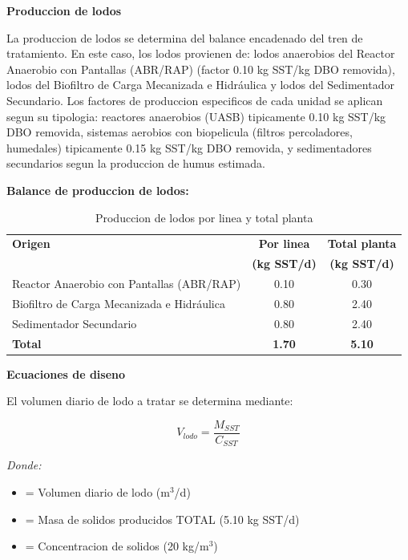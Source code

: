 \documentclass[12pt,a4paper]{article}
\begin{document}
\textbf{Produccion de lodos}

La produccion de lodos se determina del balance encadenado del tren de tratamiento. En este caso, los lodos provienen de: lodos anaerobios del Reactor Anaerobio con Pantallas (ABR/RAP) (factor 0.10 kg SST/kg DBO removida), lodos del Biofiltro de Carga Mecanizada e Hidráulica y lodos del Sedimentador Secundario. Los factores de produccion especificos de cada unidad se aplican segun su tipologia: reactores anaerobios (UASB) tipicamente 0.10 kg SST/kg DBO removida, sistemas aerobios con biopelicula (filtros percoladores, humedales) tipicamente 0.15 kg SST/kg DBO removida, y sedimentadores secundarios segun la produccion de humus estimada.

\textbf{Balance de produccion de lodos:}

\begin{table}[H]
\centering
\small
\caption{Produccion de lodos por linea y total planta}
\begin{tabular}{p{6cm}cc}
\toprule
\textbf{Origen} & \textbf{Por linea} & \textbf{Total planta} \\
 & \textbf{(kg SST/d)} & \textbf{(kg SST/d)} \\
\midrule
Reactor Anaerobio con Pantallas (ABR/RAP) & 0.10 & 0.30 \\
Biofiltro de Carga Mecanizada e Hidráulica & 0.80 & 2.40 \\
Sedimentador Secundario & 0.80 & 2.40 \\
\midrule
\textbf{Total} & \textbf{1.70} & \textbf{5.10} \\
\bottomrule
\end{tabular}
\end{table}

\textbf{Ecuaciones de diseno}

El volumen diario de lodo a tratar se determina mediante:

\begin{equation}
V_{lodo} = \frac{M_{SST}}{C_{SST}}
\end{equation}

\textit{Donde:}
\begin{itemize}[noitemsep,leftmargin=2em]
    \item[$V_{lodo}$] = Volumen diario de lodo (m$^3$/d)
    \item[$M_{SST}$] = Masa de solidos producidos TOTAL (5.10 kg SST/d)
    \item[$C_{SST}$] = Concentracion de solidos (20 kg/m$^3$)
\end{itemize}
\end{document}
